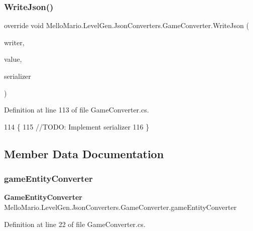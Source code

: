 \subsubsection{Write\+Json()}
{\footnotesize\ttfamily override void Mello\+Mario.\+Level\+Gen.\+Json\+Converters.\+Game\+Converter.\+Write\+Json (\begin{DoxyParamCaption}\item[{Json\+Writer}]{writer,  }\item[{object}]{value,  }\item[{Json\+Serializer}]{serializer }\end{DoxyParamCaption})}



Definition at line 113 of file Game\+Converter.\+cs.


\begin{DoxyCode}
114         \{
115             \textcolor{comment}{//TODO: Implement serializer}
116         \}
\end{DoxyCode}


\subsection{Member Data Documentation}
\mbox{\label{classMelloMario_1_1LevelGen_1_1JsonConverters_1_1GameConverter_a4e271b2ae925d3f7f51f74a1dab0e6ba}} 
\subsubsection{game\+Entity\+Converter}
{\footnotesize\ttfamily \textbf{ Game\+Entity\+Converter} Mello\+Mario.\+Level\+Gen.\+Json\+Converters.\+Game\+Converter.\+game\+Entity\+Converter\hspace{0.3cm}{\ttfamily [private]}}



Definition at line 22 of file Game\+Converter.\+cs.

\mbox{\label{classMelloMario_1_1LevelGen_1_1JsonConverters_1_1GameConverter_a31f37dd012c836a7a01eca0542f0de3d}} 
